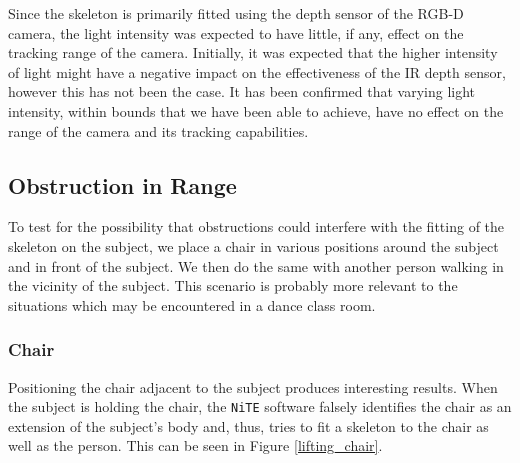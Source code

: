 \documentclass[11pt,a4paper]{article}
\begin{document}
\noindent
Since the skeleton is primarily fitted using the depth sensor of the RGB-D camera, the light intensity was expected to have little, if any, effect on the tracking range of the camera. Initially, it was expected that the higher intensity of light might have a negative impact on the effectiveness of the IR depth sensor, however this has not been the case. It has been confirmed that varying light intensity, within bounds that we have been able to achieve, have no effect on the range of the camera and its tracking capabilities.

\subsection{Obstruction in Range}
\noindent
To test for the possibility that obstructions could interfere with the fitting of the skeleton on the subject, we place a chair in various positions around the subject and in front of the subject. We then do the same with another person walking in the vicinity of the subject. This scenario is probably more relevant to the situations which may be encountered in a dance class room.  
\subsubsection{Chair}
\noindent Positioning the chair adjacent to the subject produces interesting results. When the subject is holding the chair, the \texttt{NiTE} software falsely identifies the chair as an extension of the subject's body and, thus, tries to fit a skeleton to the chair as well as the person. This can be seen in Figure \ref{lifting_chair}.
\end{document}
